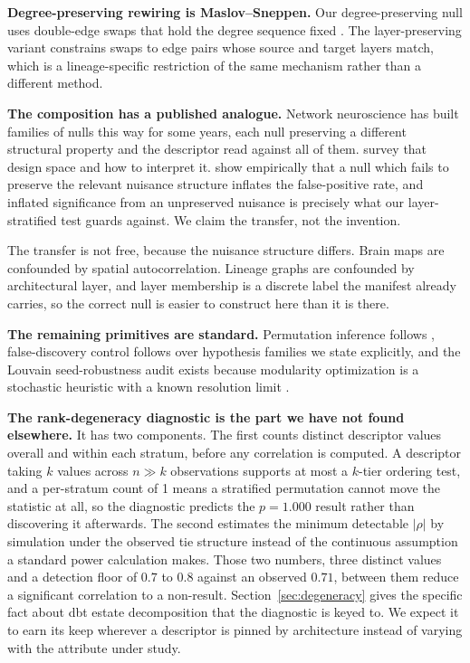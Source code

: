 \documentclass[11pt,a4paper]{article}
\begin{document}
\textbf{Degree-preserving rewiring is Maslov--Sneppen.} Our
degree-preserving null uses double-edge swaps that hold the degree
sequence fixed \citep{maslov2002specificity}. The layer-preserving
variant constrains swaps to edge pairs whose source and target layers
match, which is a lineage-specific restriction of the same mechanism
rather than a different method.

\textbf{The composition has a published analogue.} Network neuroscience
has built families of nulls this way for some years, each null
preserving a different structural property and the descriptor read
against all of them. \citet{vasa2022nullmodels} survey that design space
and how to interpret it. \citet{markello2021spatial} show empirically
that a null which fails to preserve the relevant nuisance structure
inflates the false-positive rate, and inflated significance from an
unpreserved nuisance is precisely what our layer-stratified test guards
against. We claim the transfer, not the invention.

The transfer is not free, because the nuisance structure differs. Brain
maps are confounded by spatial autocorrelation. Lineage graphs are
confounded by architectural layer, and layer membership is a discrete
label the manifest already carries, so the correct null is easier to
construct here than it is there.

\textbf{The remaining primitives are standard.} Permutation inference
follows \citet{good2005permutation}, false-discovery control follows
\citet{benjamini1995controlling} over hypothesis families we state
explicitly, and the Louvain seed-robustness audit exists because
modularity optimization is a stochastic heuristic with a known
resolution limit \citep{fortunato2007resolution}.

\textbf{The rank-degeneracy diagnostic is the part we have not found
elsewhere.} It has two components. The first counts distinct descriptor
values overall and within each stratum, before any correlation is
computed. A descriptor taking $k$ values across $n \gg k$ observations
supports at most a $k$-tier ordering test, and a per-stratum count of 1
means a stratified permutation cannot move the statistic at all, so the
diagnostic predicts the $p = 1.000$ result rather than discovering it
afterwards. The second estimates the minimum detectable $|\rho|$ by
simulation under the observed tie structure instead of the continuous
assumption a standard power calculation makes. Those two numbers, three
distinct values and a detection floor of $0.7$ to $0.8$ against an
observed $0.71$, between them reduce a significant correlation to a
non-result. Section~\ref{sec:degeneracy} gives the specific fact
about dbt estate decomposition that the diagnostic is keyed to. We
expect it to earn its keep wherever a descriptor is pinned by
architecture instead of varying with the attribute under study.
\end{document}
